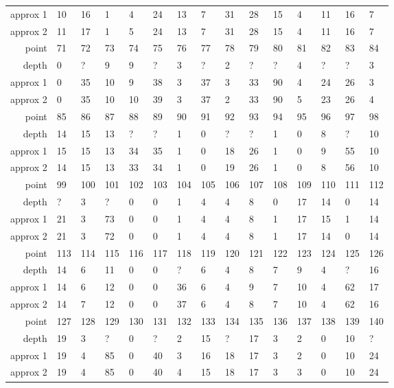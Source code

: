 \begin{center}
\begin{supertabular}{|r|l l l l l l l l l l l l l l|}
approx 1 & 10 & 16 & 1 & 4 & 24 & 13 & 7 & 31 & 28 & 15 & 4 & 11 & 16 & 7 \\
approx 2 & 11 & 17 & 1 & 5 & 24 & 13 & 7 & 31 & 28 & 15 & 4 & 11 & 16 & 7 \\
\hline
point & 71 & 72 & 73 & 74 & 75 & 76 & 77 & 78 & 79 & 80 & 81 & 82 & 83 & 84 \\
\hline
depth & 0 & ? & 9 & 9 & ? & 3 & ? & 2 & ? & ? & 4 & ? & ? & 3 \\
approx 1 & 0 & 35 & 10 & 9 & 38 & 3 & 37 & 3 & 33 & 90 & 4 & 24 & 26 & 3 \\
approx 2 & 0 & 35 & 10 & 10 & 39 & 3 & 37 & 2 & 33 & 90 & 5 & 23 & 26 & 4 \\
\hline
point & 85 & 86 & 87 & 88 & 89 & 90 & 91 & 92 & 93 & 94 & 95 & 96 & 97 & 98 \\
\hline
depth & 14 & 15 & 13 & ? & ? & 1 & 0 & ? & ? & 1 & 0 & 8 & ? & 10 \\
approx 1 & 15 & 15 & 13 & 34 & 35 & 1 & 0 & 18 & 26 & 1 & 0 & 9 & 55 & 10 \\
approx 2 & 14 & 15 & 13 & 33 & 34 & 1 & 0 & 19 & 26 & 1 & 0 & 8 & 56 & 10 \\
\hline
point & 99 & 100 & 101 & 102 & 103 & 104 & 105 & 106 & 107 & 108 & 109 & 110 & 111 & 112 \\
\hline
depth & ? & 3 & ? & 0 & 0 & 1 & 4 & 4 & 8 & 0 & 17 & 14 & 0 & 14 \\
approx 1 & 21 & 3 & 73 & 0 & 0 & 1 & 4 & 4 & 8 & 1 & 17 & 15 & 1 & 14 \\
approx 2 & 21 & 3 & 72 & 0 & 0 & 1 & 4 & 4 & 8 & 1 & 17 & 14 & 0 & 14 \\
\hline
point & 113 & 114 & 115 & 116 & 117 & 118 & 119 & 120 & 121 & 122 & 123 & 124 & 125 & 126 \\
\hline
depth & 14 & 6 & 11 & 0 & 0 & ? & 6 & 4 & 8 & 7 & 9 & 4 & ? & 16 \\
approx 1 & 14 & 6 & 12 & 0 & 0 & 36 & 6 & 4 & 9 & 7 & 10 & 4 & 62 & 17 \\
approx 2 & 14 & 7 & 12 & 0 & 0 & 37 & 6 & 4 & 8 & 7 & 10 & 4 & 62 & 16 \\
\hline
point & 127 & 128 & 129 & 130 & 131 & 132 & 133 & 134 & 135 & 136 & 137 & 138 & 139 & 140 \\
\hline
depth & 19 & 3 & ? & 0 & ? & 2 & 15 & ? & 17 & 3 & 2 & 0 & 10 & ? \\
approx 1 & 19 & 4 & 85 & 0 & 40 & 3 & 16 & 18 & 17 & 3 & 2 & 0 & 10 & 24 \\
approx 2 & 19 & 4 & 85 & 0 & 40 & 4 & 15 & 18 & 17 & 3 & 3 & 0 & 10 & 24 \\

\end{supertabular}
\end{center}
